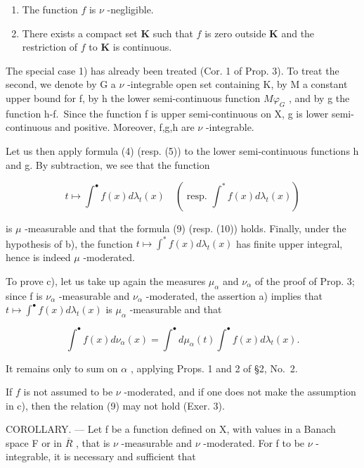 \begin{enumerate}
\def\labelenumi{\arabic{enumi})}
\item
  The function \(f\) is \(\nu\) -negligible.
\item
  There exists a compact set \(\mathbf{K}\) such that \(f\) is zero outside \(\mathbf{K}\) and the restriction of \(f\) to \(\mathbf{K}\) is continuous.
\end{enumerate}

The special case 1) has already been treated (Cor. 1 of Prop. 3). To treat the second, we denote by G a \(\nu\) -integrable open set containing K, by M a constant upper bound for f, by h the lower semi-continuous function \(M\varphi_{G}\) , and by g the function h-f.~Since the function f is upper semi-continuous on X, g is lower semi-continuous and positive. Moreover, f,g,h are \(\nu\) -integrable.

Let us then apply formula (4) (resp. (5)) to the lower semi-continuous functions h and g. By subtraction, we see that the function

\[
t \mapsto \int^ {\bullet} f (x) d \lambda_ {t} (x) \quad (\text { resp. } \int^ {*} f (x) d \lambda_ {t} (x))
\]

is \(\mu\) -measurable and that the formula (9) (resp. (10)) holds. Finally, under the hypothesis of b), the function \(t \mapsto \int^{*} f(x) d\lambda_{t}(x)\) has finite upper integral, hence is indeed \(\mu\) -moderated.

To prove c), let us take up again the measures \(\mu_{\alpha}\) and \(\nu_{\alpha}\) of the proof of Prop. 3; since f is \(\nu_{\alpha}\) -measurable and \(\nu_{\alpha}\) -moderated, the assertion a) implies that \(t \mapsto \int^{\bullet} f(x) d\lambda_{t}(x)\) is \(\mu_{\alpha}\) -measurable and that

\[
\int^ {\bullet} f (x) d \nu_ {\alpha} (x) = \int^ {\bullet} d \mu_ {\alpha} (t) \int^ {\bullet} f (x) d \lambda_ {t} (x).
\]

It remains only to sum on \(\alpha\) , applying Props. 1 and 2 of §2, No.~2.

If \(f\) is not assumed to be \(\nu\) -moderated, and if one does not make the assumption in c), then the relation (9) may not hold (Exer. 3).

COROLLARY. --- Let f be a function defined on X, with values in a Banach space F or in \(\overline{R}\) , that is \(\nu\) -measurable and \(\nu\) -moderated. For f to be \(\nu\) -integrable, it is necessary and sufficient that

